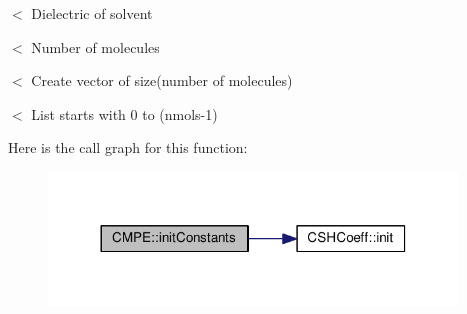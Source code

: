 $<$ Dielectric of solvent

$<$ Number of molecules

$<$ Create vector of size(number of molecules)

$<$ List starts with 0 to (nmols-\/1) 

Here is the call graph for this function\-:
\nopagebreak
\begin{figure}[H]
\begin{center}
\leavevmode
\includegraphics[width=308pt]{classCMPE_accac27799cb676fb3160683583a8619e_cgraph}
\end{center}
\end{figure}


